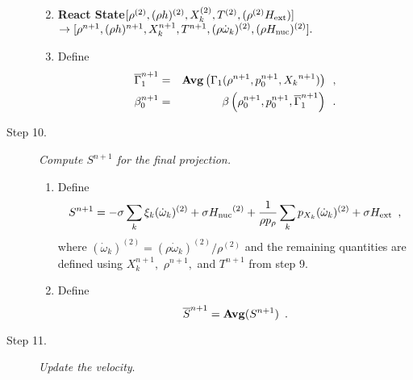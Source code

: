 \documentclass[11pt]{article}
\newcommand{\gammabar}{\overline{\Gamma}_1}
\newcommand{\Hext}{{H_{\rm ext}}}
\newcommand{\Hnuc}{{H_{\rm nuc}}}
\newcommand{\omegadot}{\dot{\omega}}
\begin{document}
\begin{description}
\begin{enumerate}
\renewcommand{\theenumi}{{\bf \alph{enumi}}}

\item {\bf React State}$[\rho^{(2)},(\rho h)^{(2)}, X_k^{(2)},T^{(2)}, (\rho^{(2)} \Hext) ]$\\
                   $\rightarrow [\rho^{n+1}, (\rho h)^{n+1}, X_k^{n+1}, T^{n+1}, 
                               (\rho \omegadot_k)^{(2)}, (\rho \Hnuc)^{(2)} ].$  

\item Define
\begin{eqnarray}
 \gammabar^{n+1}    &=& {\rm{\bf Avg}}\left(\Gamma_1(\rho^{n+1}, p_0^{n+1}, {X_k}^{n+1}) \right) \enskip , \\ 
 {\beta   }_0^{n+1}    &=& \beta   \left(\rho_0^{n+1}, p_0^{n+1},   \gammabar^{n+1}\right) \enskip .
\end{eqnarray}

\end{enumerate}

\item[Step 10.] {\em Compute $S^{n+1}$ for the final projection.}

\begin{enumerate}
\renewcommand{\theenumi}{{\bf \alph{enumi}}}
\item Define
\begin{equation}
  S^{n+1} =  -\sigma  \sum_k  \xi_k (\omegadot_k)^{(2)}  + \sigma \Hnuc^{(2)} +
  \frac{1}{\rho p_\rho} \sum_k p_{X_k}  ({\omegadot}_k)^{(2)}  
   + \sigma \Hext \enskip ,
\end{equation}
where $(\omegadot_k)^{(2)} = (\rho \omegadot_k)^{(2)} / \rho^{(2)}$
and the remaining quantities are defined using $X_k^{n+1},$ $\rho^{n+1},$
and $T^{n+1}$ from step 9.

\item Define
\begin{equation}
\overline{S}^{n+1} = {\mathrm{\bf Avg}} (S^{n+1}) \enskip.
\end{equation}

\end{enumerate}


\item[Step 11.] {\em Update the velocity}.  


\end{description}
\end{document}
